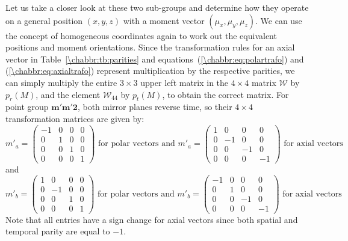 Let us take a closer look at these two sub-groups and determine how they operate on a general position $(x,y,z)$ with a moment vector $(\mu_x,\mu_y,\mu_z)$. We can use the concept of homogeneous coordinates again to work out the equivalent positions and moment orientations.  Since the transformation rules for an axial vector in Table~\ref{\chabbr:tb:parities} and equations~(\ref{\chabbr:eq:polartrafo}) and (\ref{\chabbr:eq:axialtrafo}) represent multiplication by the respective parities, we can simply multiply the entire $3\times 3$ upper left matrix in the $4\times 4$ matrix $\mathcal{W}$ by $p_r(M)$, and the element $\mathcal{W}_{44}$ by $p_t(M)$, to obtain the correct matrix.  For point group $\mathbf{m'm'2}$, both mirror planes reverse time, so their $4\times 4$ transformation matrices are given by:
\[
	m'_a = \begin{pmatrix}-1 & 0 & 0 & 0\\ 0 & 1 & 0 & 0\\ 0  & 0 & 1 & 0\\ 0&0&0&1\end{pmatrix}
\text{ for polar vectors and }	m'_a = \begin{pmatrix}1 & 0 & 0 & 0\\ 0 & -1 & 0 & 0\\ 0  & 0 & -1 & 0\\ 0&0&0&-1\end{pmatrix}\text{ for axial vectors}
\]
and
\[
	m'_b = \begin{pmatrix}1 & 0 & 0 & 0\\ 0 & -1 & 0 & 0\\ 0  & 0 & 1 & 0\\ 0&0&0&1\end{pmatrix}
\text{ for polar vectors and }	m'_b = \begin{pmatrix}-1 & 0 & 0 & 0\\ 0 & 1 & 0 & 0\\ 0  & 0 & -1 & 0\\ 0&0&0&-1\end{pmatrix}\text{ for axial vectors}
\]
Note that all entries have a sign change for axial vectors since both spatial and temporal parity are equal to $-1$. 

